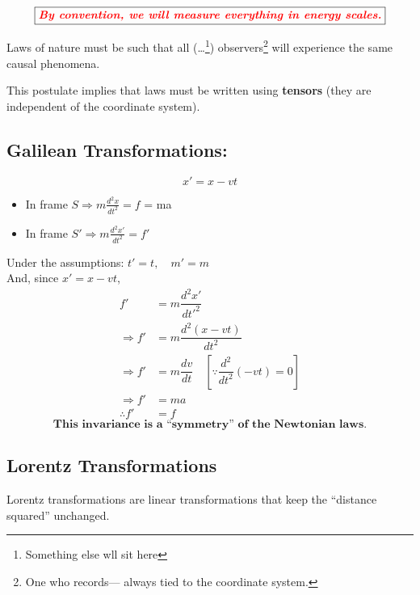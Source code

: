 \documentclass[14pt]{article} %
\begin{document}
$$\fbox{\textcolor{red}{\textbf{\textit{By convention, we will measure everything in energy scales.}}}}$$
\vspace{0.3cm}
\begin{tcolorbox}[ title=Postulate 1 :]
Laws of nature must be such that all (\ldots \footnote{Something else wll sit here}) observers\footnote{One who records--- always tied to the coordinate system.} will experience the same causal phenomena.
\end{tcolorbox}
\noindent
This postulate implies that laws must be written using \textbf{tensors} (they are independent of the coordinate system).
\newpage
\subsection*{Galilean Transformations:}
$$ x' = x - vt $$
\begin{itemize}
    \item In frame $S \Rightarrow m \frac{d^2x}{dt^2} = f$ = ma
    \item In frame $S' \Rightarrow m \frac{d^2x'}{dt^2} = f'$
\end{itemize}
Under the assumptions: \quad $t' = t, \quad m' = m$ \\
And, since $x' = x - vt$,
\begin{align*}
    f' &= m \dfrac{d^2 x'}{dt'^2} \\
    \Rightarrow f' &= m \dfrac{d^2 (x - vt)}{dt^2} \\
    \Rightarrow f' &= m \dfrac{dv}{dt} \quad [\because\dfrac{d^2}{dt^2}(-vt) = 0] \\
    \Rightarrow f' &= ma \\
    \therefore f'&= f
\end{align*}
$$ \textbf{This invariance is a ``symmetry'' of the Newtonian laws.} $$
\subsection*{Lorentz Transformations}
Lorentz transformations are linear transformations that keep the ``distance squared'' unchanged.
\end{document}
